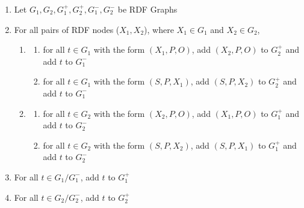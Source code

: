 \begin{enumerate}
    \item Let $G_1, G_2, G^+_1, G^+_2, G^-_1, G^-_2$ be RDF Graphs
    \item For all pairs of RDF nodes ($X_1, X_2$), where $X_1 \in G_1$ and $X_2 \in G_2$,
    \begin{enumerate}
    \item \begin{enumerate}
        \item for all $t \in G_1$ with the form $(X_1, P, O)$,    add $(X_2, P, O)$ to $G^+_2$ and add $t$ to $G^-_1$
        \item for all $t \in G_1$ with the form $(S, P, X_1)$,    add $(S, P, X_2)$ to $G^+_2$ and add $t$ to $G^-_1$
    \end{enumerate} \item \begin{enumerate}
        \item for all $t \in G_2$ with the form $(X_2, P, O)$,    add $(X_1, P, O)$ to $G^+_1$ and add $t$ to $G^-_2$
        \item for all $t \in G_2$ with the form $(S, P, X_2)$,    add $(S, P, X_1)$ to $G^+_1$ and add $t$ to $G^-_2$
    \end{enumerate}

    \end{enumerate}
    
    \item For all $t \in G_1/G^{-}_1$, add $t$ to $G^{+}_{1}$
    \item For all $t \in G_2/G^{-}_2$, add $t$ to $G^{+}_{2}$
\end{enumerate}

